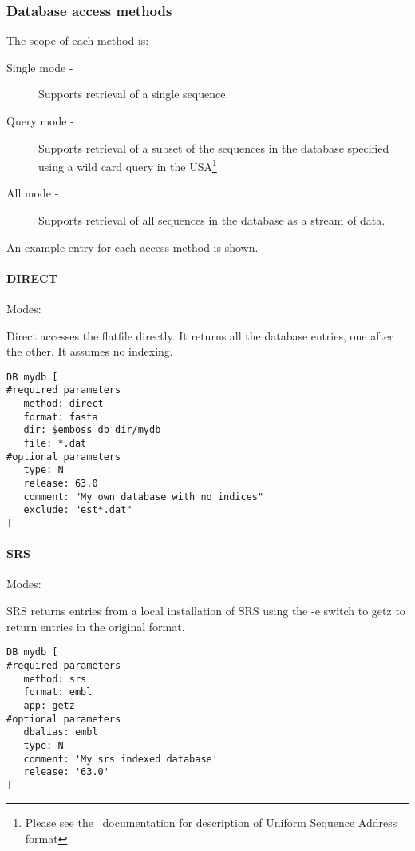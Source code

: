 \documentclass{report}
\begin{document}
\subsubsection{Database access methods}

The scope of each method is:
\begin{description}
\item[Single mode - ] Supports retrieval of a single sequence.
\item[Query mode - ] Supports retrieval of a subset of the sequences in the database specified using a wild card query in the USA\footnote{Please see the \EMBOSS\ documentation for description of Uniform Sequence Address format}
\item[All mode - ] Supports retrieval of all sequences in the database as a stream of data.
\end{description}

An example entry for each access method is shown.

\paragraph{DIRECT}\par\noindent
Modes: \par\noindent
Direct accesses the flatfile directly. It returns all the database entries, one after the other. It assumes no indexing.
 
\begin{verbatim}
DB mydb [ 
#required parameters
   method: direct
   format: fasta
   dir: $emboss_db_dir/mydb
   file: *.dat   
#optional parameters
   type: N
   release: 63.0
   comment: "My own database with no indices"
   exclude: "est*.dat"
]
\end{verbatim}

\paragraph{SRS}\par\noindent
Modes: \par\noindent
SRS returns entries from a local installation of SRS using the -e switch to getz to return entries in the original format.

\begin{verbatim}
DB mydb [
#required parameters
   method: srs
   format: embl
   app: getz
#optional parameters
   dbalias: embl
   type: N
   comment: 'My srs indexed database'
   release: '63.0'
]
\end{verbatim}
\end{document}
